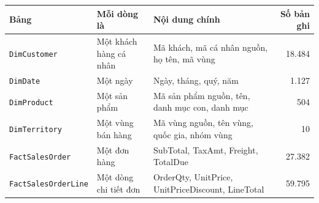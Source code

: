\begin{tabular}{lp{3.3cm}p{5.6cm}r}
\toprule
Bảng & Mỗi dòng là & Nội dung chính & Số bản ghi \\
\midrule
\texttt{DimCustomer} & Một khách hàng cá nhân & Mã khách, mã cá nhân nguồn, họ tên, mã vùng & 18.484 \\
\texttt{DimDate} & Một ngày & Ngày, tháng, quý, năm & 1.127 \\
\texttt{DimProduct} & Một sản phẩm & Mã sản phẩm nguồn, tên, danh mục con, danh mục & 504 \\
\texttt{DimTerritory} & Một vùng bán hàng & Mã vùng nguồn, tên vùng, quốc gia, nhóm vùng & 10 \\
\texttt{FactSalesOrder} & Một đơn hàng & SubTotal, TaxAmt, Freight, TotalDue & 27.382 \\
\texttt{FactSalesOrderLine} & Một dòng chi tiết đơn & OrderQty, UnitPrice, UnitPriceDiscount, LineTotal & 59.795 \\
\bottomrule
\end{tabular}
